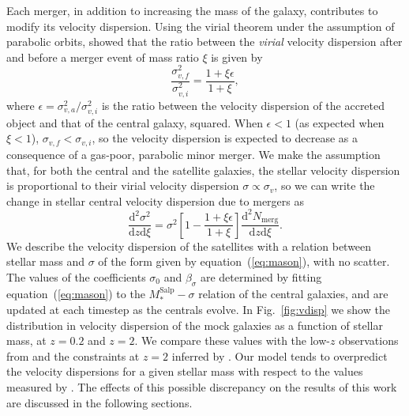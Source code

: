 \documentclass[usenatbib]{mnras}
\def\msalp{M_*^{\mathrm{Salp}}}
\def\Fref#1{Fig.~\ref{#1}\xspace}
\def\Eref#1{equation~(\ref{#1})\xspace}
\begin{document}
Each merger, in addition to increasing the mass of the galaxy,
contributes to modify its velocity dispersion. Using the virial
theorem under the assumption of parabolic orbits, \citet{NJO09} showed
that the ratio between the {\em virial} velocity dispersion after and
before a merger event of mass ratio $\xi$ is given by
\begin{equation}
\frac{\sigma_{v,f}^2}{\sigma_{v,i}^2} = \frac{1 + \xi\epsilon}{1 + \xi},
\end{equation}
where $\epsilon = \sigma_{v,a}^2/\sigma_{v,i}^2$ is the ratio between
the velocity dispersion of the accreted object and that of the central
galaxy, squared.  When $\epsilon<1$ (as expected when $\xi<1$),
  $\sigma_{v,f}<\sigma_{v,i}$, so the velocity dispersion is expected
  to decrease as a consequence of a gas-poor, parabolic minor
  merger. We make the assumption that, for both the central and the
  satellite galaxies, the stellar velocity dispersion is proportional
  to their virial velocity dispersion $\sigma \propto \sigma_v$, so we
  can write the change in stellar central velocity dispersion due to
  mergers as
\begin{equation}
\frac{\mathrm{d}^2\sigma^2}{\mathrm{d}z\mathrm{d}\xi} = \sigma^2\left[1-\frac{1 + \xi\epsilon}{1 + \xi}\right]\frac{\mathrm{d}^2N_{\mathrm{merg}}}{\mathrm{d}z \mathrm{d}\xi}.
\end{equation}
We
describe the velocity dispersion of the satellites with a relation
between stellar mass and $\sigma$ of the form given by
\Eref{eq:mason}, with no scatter. The values of the coefficients
$\sigma_0$ and $\beta_\sigma$ are determined by fitting
\Eref{eq:mason} to the $\msalp-\sigma$ relation of the central
galaxies, and are updated at each timestep as the centrals evolve.  In
\Fref{fig:vdisp} we show the distribution in velocity dispersion of
the mock galaxies as a function of stellar mass, at $z=0.2$ and
$z=2$. We compare these values with the low-$z$ observations from
\citet{Aug++10} and the constraints at $z=2$ inferred by
\citet{Mas++15}. Our model tends to overpredict the velocity
  dispersions for a given stellar mass with respect to the values
  measured by \citet{Mas++15}. The effects of this possible
discrepancy on the results of this work are discussed in the following
sections.
%
\end{document}
